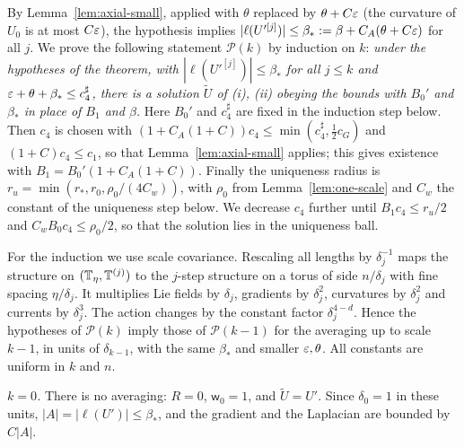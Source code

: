 By Lemma~\ref{lem:axial-small}, applied with $\theta$ replaced by $\theta+C\varepsilon$ (the curvature of $U_0$ is at most $C\varepsilon$), the hypothesis implies $|\ell(U'^{[j]})|\le\beta_*:=\beta+C_A(\theta+C\varepsilon)$ for all $j$. We prove the following statement $\mathcal P(k)$ by induction on $k$: \emph{under the hypotheses of the theorem, with $|\ell(U'^{[j]})|\le\beta_*$ for all $j\le k$ and $\varepsilon+\theta+\beta_*\le c_4^\sharp$, there is a solution $\tilde U$ of (i), (ii) obeying the bounds with $B_0'$ and $\beta_*$ in place of $B_1$ and $\beta$.} Here $B_0'$ and $c_4^\sharp$ are fixed in the induction step below. Then $c_4$ is chosen with $(1+C_A(1+C))c_4\le\min(c_4^\sharp,\frac12c_G)$ and $(1+C)c_4\le c_1$, so that Lemma~\ref{lem:axial-small} applies; this gives existence with $B_1=B_0'(1+C_A(1+C))$. Finally the uniqueness radius is $r_u=\min(r_*,r_0,\rho_0/(4C_w))$, with $\rho_0$ from Lemma~\ref{lem:one-scale} and $C_w$ the constant of the uniqueness step below. We decrease $c_4$ further until $B_1c_4\le r_u/2$ and $C_wB_0c_4\le\rho_0/2$, so that the solution lies in the uniqueness ball.

For the induction we use scale covariance. Rescaling all lengths by $\delta_j^{-1}$ maps the structure on $(\mathbb T_\eta,\mathbb T^{(j)})$ to the $j$-step structure on a torus of side $n/\delta_j$ with fine spacing $\eta/\delta_j$. It multiplies Lie fields by $\delta_j$, gradients by $\delta_j^2$, curvatures by $\delta_j^2$ and currents by $\delta_j^3$. The action changes by the constant factor $\delta_j^{4-d}$. Hence the hypotheses of $\mathcal P(k)$ imply those of $\mathcal P(k-1)$ for the averaging up to scale $k-1$, in units of $\delta_{k-1}$, with the same $\beta_*$ and smaller $\varepsilon,\theta$. All constants are uniform in $k$ and $n$.

\emph{$k=0$.} There is no averaging: $R=0$, $\mathsf w_0=1$, and $\tilde U=U'$. Since $\delta_0=1$ in these units, $|A|=|\ell(U')|\le\beta_*$, and the gradient and the Laplacian are bounded by $C|A|$.

